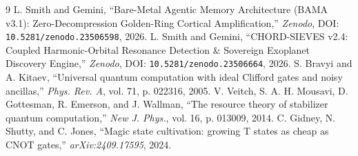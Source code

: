 \documentclass[10pt,twocolumn]{article}
\begin{document}
\begin{thebibliography}{9}
 L. Smith and Gemini, ``Bare-Metal Agentic Memory Architecture (BAMA v3.1): Zero-Decompression Golden-Ring Cortical Amplification,'' \emph{Zenodo}, DOI: \texttt{10.5281/zenodo.23506598}, 2026.
 L. Smith and Gemini, ``CHORD-SIEVES v2.4: Coupled Harmonic-Orbital Resonance Detection \& Sovereign Exoplanet Discovery Engine,'' \emph{Zenodo}, DOI: \texttt{10.5281/zenodo.23506664}, 2026.
 S. Bravyi and A. Kitaev, ``Universal quantum computation with ideal Clifford gates and noisy ancillas,'' \emph{Phys. Rev. A}, vol. 71, p. 022316, 2005.
 V. Veitch, S. A. H. Mousavi, D. Gottesman, R. Emerson, and J. Wallman, ``The resource theory of stabilizer quantum computation,'' \emph{New J. Phys.}, vol. 16, p. 013009, 2014.
 C. Gidney, N. Shutty, and C. Jones, ``Magic state cultivation: growing T states as cheap as CNOT gates,'' \emph{arXiv:2409.17595}, 2024.
\end{thebibliography}
\end{document}
